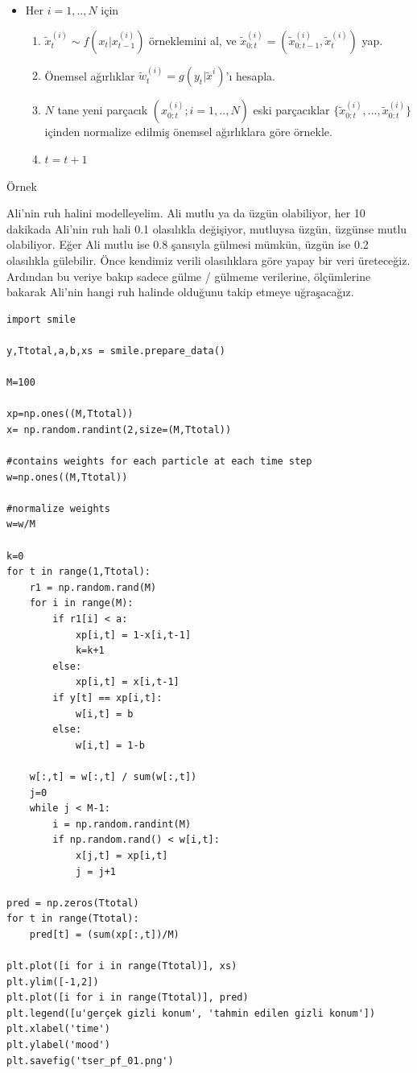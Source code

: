 \documentclass[12pt,fleqn]{article}\usepackage{../../common}
\begin{document}
\begin{itemize}
  \item Her $i=1,..,N$ için 
  \begin{enumerate}
     \item $\tilde{x}_t^{(i)} \sim f(x_t|x_{t-1}^{(i)})$ örneklemini al, ve
       $\tilde{x}_{0:t}^{(i)} = ( \tilde{x}_{0:t-1}^{(i)},\tilde{x}_{t}^{(i)})$ yap. 
     \item Önemsel ağırlıklar $\tilde{w}_t^{(i)} = g(y_t|\tilde{x}^{{i}})$'ı hesapla.
     \item $N$ tane yeni parçacık $(x_{0:t}^{(i)}; i=1,..,N )$ eski parçacıklar 
       $\{ \tilde{x}^{(i)}_{0:t},...,\tilde{x}^{(i)}_{0:t} \}$ içinden
       normalize edilmiş önemsel ağırlıklara göre örnekle. 
     \item $t = t + 1$ 
  \end{enumerate}
\end{itemize}

Örnek

Ali'nin ruh halini modelleyelim. Ali mutlu ya da üzgün olabiliyor, her 10
dakikada Ali'nin ruh hali 0.1 olasılıkla değişiyor, mutluysa üzgün, üzgünse
mutlu olabiliyor. Eğer Ali mutlu ise 0.8 şansıyla gülmesi mümkün, üzgün ise 0.2
olasılıkla gülebilir. Önce kendimiz verili olasılıklara göre yapay bir veri
üreteceğiz. Ardından bu veriye bakıp sadece gülme / gülmeme verilerine,
ölçümlerine bakarak Ali'nin hangi ruh halinde olduğunu takip etmeye
uğraşacağız. 
  
\begin{verbatim}
import smile
  
y,Ttotal,a,b,xs = smile.prepare_data()
            
M=100

xp=np.ones((M,Ttotal))
x= np.random.randint(2,size=(M,Ttotal))

#contains weights for each particle at each time step
w=np.ones((M,Ttotal))

#normalize weights
w=w/M

k=0
for t in range(1,Ttotal):
    r1 = np.random.rand(M) 
    for i in range(M):
        if r1[i] < a:
            xp[i,t] = 1-x[i,t-1] 
            k=k+1
        else:
            xp[i,t] = x[i,t-1] 
        if y[t] == xp[i,t]:
            w[i,t] = b
        else:
            w[i,t] = 1-b

    w[:,t] = w[:,t] / sum(w[:,t])    
    j=0
    while j < M-1:
        i = np.random.randint(M)
        if np.random.rand() < w[i,t]:
            x[j,t] = xp[i,t]
            j = j+1

pred = np.zeros(Ttotal)
for t in range(Ttotal):
    pred[t] = (sum(xp[:,t])/M)

plt.plot([i for i in range(Ttotal)], xs)
plt.ylim([-1,2])
plt.plot([i for i in range(Ttotal)], pred)
plt.legend([u'gerçek gizli konum', 'tahmin edilen gizli konum'])
plt.xlabel('time')
plt.ylabel('mood')
plt.savefig('tser_pf_01.png')
\end{verbatim}
\end{document}
